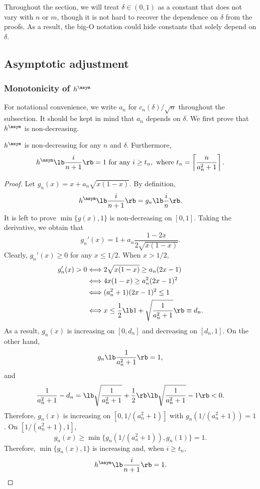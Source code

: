 Throughout the section, we will treat $\delta\in (0, 1)$ as a constant that does not vary with $n$ or $m$, though it is not hard to recover the dependence on $\delta$ from the proofs. As a result, the big-O notation could hide constants that solely depend on $\delta$.

\subsection{Asymptotic adjustment}\label{subsec:fisher_asym}
\subsubsection{Monotonicity of $h^\asym$}\label{subsubsec:fisher_asym_monotonicity}
  For notational convenience, we write $a_n$ for $c_n(\delta) / \sqrt{n}$ throughout the subsection. It should be kept in mind that $a_{n}$ depends on $\delta$. We first prove that $h^\asym$ is non-decreasing.
  \begin{prop}\label{prop:hasym_increasing}
  $h^\asym$ is non-decreasing for any $n$ and $\delta$. Furthermore,
  \[h^\asym\lb \frac{i}{n+1}\rb = 1\text{ for any }i\ge t_n, \text{ where }t_n = \left\lceil \frac{n}{a_n^2 + 1}\right\rceil.\]
\end{prop}
\begin{proof}
  Let $g_n(x) = x + a_n\sqrt{x(1 - x)}$. By definition,
  \[h^\asym\lb \frac{i}{n+1}\rb = g_n\lb\frac{i}{n}\rb.\]
  It is left to prove $\min\{g(x), 1\}$ is non-decreasing on $[0, 1]$. Taking the derivative, we obtain that
  \[g_n'(x) = 1 + a_n \frac{1 - 2x}{2\sqrt{x(1 - x)}}.\]
  Clearly, $g_n'(x)\ge 0$ for any $x \le 1/2$. When $x > 1/2$,
  \begin{align*}
    g_n'(x) > 0 & \Longleftrightarrow 2\sqrt{x(1 - x)} \ge a_n(2x - 1)\\
              & \Longleftrightarrow 4x(1 - x) \ge a_n^2(2x - 1)^2\\
              & \Longleftrightarrow (a_n^2 + 1)(2x - 1)^2 \le 1\\
              & \Longleftrightarrow x \le \frac{1}{2}\lb 1 + \sqrt{\frac{1}{a_n^2 + 1}}\rb\equiv d_n.
  \end{align*}
  As a result, $g_n(x)$ is increasing on $[0, d_n]$ and decreasing on $[d_n, 1]$. On the other hand,
  \[g_n\lb\frac{1}{a_n^2 + 1}\rb = 1,\]
  and
  \[\frac{1}{a_n^2 + 1} - d_n = \lb \sqrt{\frac{1}{a_n^2 + 1}} + \frac{1}{2}\rb\lb \sqrt{\frac{1}{a_n^2 + 1}}- 1\rb < 0.\]
  Therefore, $g_n(x)$ is increasing on $[0, 1/(a_n^2 + 1)]$ with $g_n(1/(a_n^2 + 1)) = 1$. On $[1/(a_n^2 + 1), 1]$,
  \[g_n(x)\ge \min\{g_n(1/(a_n^2 + 1)), g_n(1)\} = 1.\]
  Therefore, $\min\{g_n(x), 1\}$ is increasing and, when $i\ge t_n$,
  \[h^\asym\lb\frac{i}{n+1}\rb = 1.\]
\end{proof}

